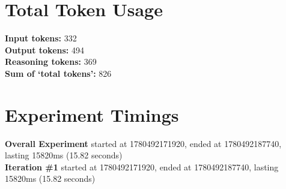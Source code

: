 \documentclass{article}
\begin{document}
\section*{Total Token Usage}
\textbf{Input tokens: }332
\\\textbf{Output tokens: }494
\\\textbf{Reasoning tokens: }369
\\\textbf{Sum of `total tokens': }826
\section*{Experiment Timings}
\textbf{Overall Experiment} started at 1780492171920, ended at 1780492187740, lasting 15820ms (15.82 seconds)
\\\textbf{Iteration \#1} started at 1780492171920, ended at 1780492187740, lasting 15820ms (15.82 seconds)
\end{document}
